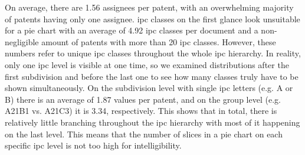 On average, there are 1.56 assignees per patent, with an overwhelming majority of patents having only one assignee.
\gls{ipc} classes on the first glance look unsuitable for a pie chart with an average of 4.92 \gls{ipc} classes per document and a non-negligible amount of patents with more than 20 \gls{ipc} classes.
However, these numbers refer to unique \gls{ipc} classes throughout the whole \gls{ipc} hierarchy.
In reality, only one \gls{ipc} level is visible at one time, so we examined distributions after the first subdivision and before the last one to see how many classes truly have to be shown simultaneously.
On the subdivision level with single \gls{ipc} letters (e.g. A or B) there is an average of 1.87 values per patent, and on the group level (e.g. A21B1 vs. A21C3) it is 3.34, respectively.
This shows that in total, there is relatively little branching throughout the \gls{ipc} hierarchy with most of it happening on the last level. 
This means that the number of slices in a pie chart on each specific \gls{ipc} level is not too high for intelligibility.

